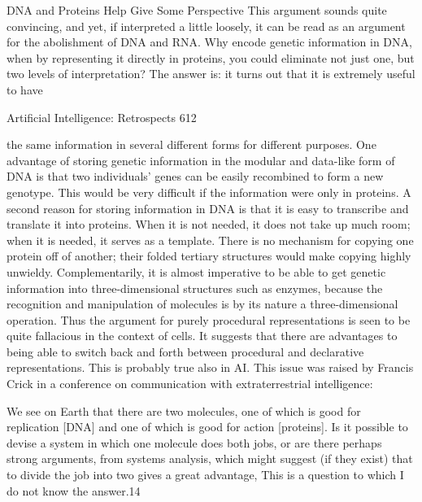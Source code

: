 {                DNA and Proteins Help Give Some Perspective
This argument sounds quite convincing, and yet, if interpreted a little loosely, it can be
read as an argument for the abolishment of DNA and RNA. Why encode genetic
information in DNA, when by representing it directly in proteins, you could eliminate not
just one, but two levels of interpretation? The answer is: it turns out that it is extremely
useful to have




Artificial Intelligence: Retrospects                                                    612

the same information in several different forms for different purposes. One advantage of
storing genetic information in the modular and data-like form of DNA is that two
individuals' genes can be easily recombined to form a new genotype. This would be very
difficult if the information were only in proteins. A second reason for storing information
in DNA is that it is easy to transcribe and translate it into proteins. When it is not needed,
it does not take up much room; when it is needed, it serves as a template. There is no
mechanism for copying one protein off of another; their folded tertiary structures would
make copying highly unwieldy. Complementarily, it is almost imperative to be able to get
genetic information into three-dimensional structures such as enzymes, because the
recognition and manipulation of molecules is by its nature a three-dimensional operation.
Thus the argument for purely procedural representations is seen to be quite fallacious in
the context of cells. It suggests that there are advantages to being able to switch back and
forth between procedural and declarative representations. This is probably true also in AI.
        This issue was raised by Francis Crick in a conference on communication with
extraterrestrial intelligence:

           We see on Earth that there are two molecules, one of which is good for
   replication [DNA] and one of which is good for action [proteins]. Is it possible to
   devise a system in which one molecule does both jobs, or are there perhaps strong
   arguments, from systems analysis, which might suggest (if they exist) that to divide
   the job into two gives a great advantage, This is a question to which I do not know
   the answer.14

}

